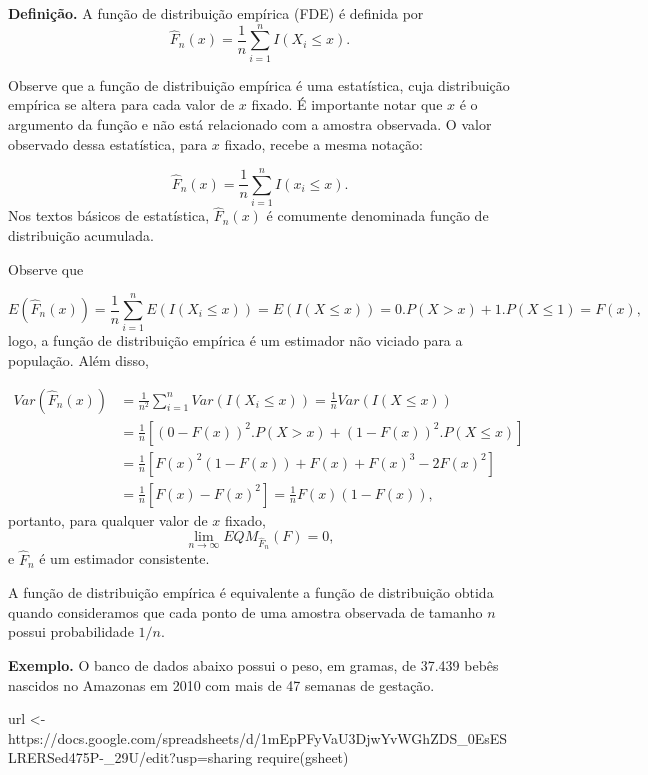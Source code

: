 \documentclass[
  letterpaper,
  DIV=11,
  numbers=noendperiod]{scrartcl}
\newenvironment{Shaded}{\begin{snugshade}}{\end{snugshade}}
\newcommand{\FunctionTok}[1]{\textcolor[rgb]{0.28,0.35,0.67}{#1}}
\newcommand{\NormalTok}[1]{\textcolor[rgb]{0.00,0.23,0.31}{#1}}
\newcommand{\OtherTok}[1]{\textcolor[rgb]{0.00,0.23,0.31}{#1}}
\newcommand{\StringTok}[1]{\textcolor[rgb]{0.13,0.47,0.30}{#1}}
\begin{document}
\textbf{Definição.} A função de distribuição empírica (FDE) é definida
por \[\hat{F}_{n}(x)=\frac{1}{n}\sum_{i=1}^n I(X_i\leq x).\]

Observe que a função de distribuição empírica é uma estatística, cuja
distribuição empírica se altera para cada valor de \(x\) fixado. É
importante notar que \(x\) é o argumento da função e não está
relacionado com a amostra observada. O valor observado dessa
estatística, para \(x\) fixado, recebe a mesma notação:

\[\hat{F}_{n}(x)=\frac{1}{n}\sum_{i=1}^n I(x_i\leq x).\] Nos textos
básicos de estatística, \(\hat{F}_n(x)\) é comumente denominada função
de distribuição acumulada.

Observe que

\[E(\hat{F}_{n}(x))=\frac{1}{n}\sum_{i=1}^n E(I(X_i\leq x))=E(I(X\leq x))=0.P(X>x)+1.P(X\leq 1)=F(x),\]
logo, a função de distribuição empírica é um estimador não viciado para
a população. Além disso,

\[\begin{align}Var(\hat{F}_{n}(x))&=\frac{1}{n^2}\sum_{i=1}^n Var(I(X_i\leq x))=\frac{1}{n}Var(I(X\leq x))\\&=\frac{1}{n}\left[(0-F(x))^2.P(X>x)+(1-F(x))^2.P(X\leq x)\right]\\&=\frac{1}{n}\left[F(x)^2(1-F(x))+F(x)+F(x)^3-2F(x)^2\right]\\&=\frac{1}{n}\left[F(x)-F(x)^2\right]=\frac{1}{n}F(x)(1-F(x)),\end{align}\]
portanto, para qualquer valor de \(x\) fixado,
\[\lim_{n\rightarrow\infty }EQM_{\hat{F}_n}(F)=0,\] e \(\hat{F}_n\) é um
estimador consistente.

A função de distribuição empírica é equivalente a função de distribuição
obtida quando consideramos que cada ponto de uma amostra observada de
tamanho \(n\) possui probabilidade \(1/n\).

\textbf{Exemplo.} O banco de dados abaixo possui o peso, em gramas, de
37.439 bebês nascidos no Amazonas em 2010 com mais de 47 semanas de
gestação.

\begin{Shaded}
\begin{Highlighting}[]
\NormalTok{url }\OtherTok{\textless{}{-}} \StringTok{\textquotesingle{}https://docs.google.com/spreadsheets/d/1mEpPFyVaU3DjwYvWGhZDS\_0EsESLRERSed475P{-}\_29U/edit?usp=sharing\textquotesingle{}}
\FunctionTok{require}\NormalTok{(gsheet)}
\end{Highlighting}
\end{Shaded}
\end{document}
